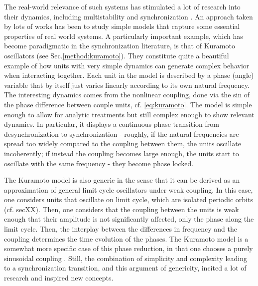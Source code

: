 The real-world relevance of such systems has stimulated a lot of research into their dynamics, including multistability and synchronization \cite{}. An approach taken by lots of works has been to study simple models that capture some essential properties of real world systems. A particularly important example, which has become paradigmatic in the synchronization literature, is that of Kuramoto oscillators (see Sec.\ref{method:kuramoto}). They constitute quite a beautiful example of how units with very simple dynamics can generate complex behavior when interacting together. Each unit in the model is described by a phase (angle) variable that by itself just varies linearly according to its own natural frequency. The interesting dynamics comes from the nonlinear coupling, done via the sin of the phase difference between couple units, cf. \eqref{eq:kuramoto}. The model is simple enough to allow for analytic treatments \cite{} but still complex enough to show relevant dynamics. In particular, it displays a continuous phase transition from desynchronization to synchronization - roughly, if the natural frequencies are spread too widely compared to the coupling between them, the units oscillate incoherently; if instead the coupling becomes large enough, the units start to oscillate with the same frequency - they become phase locked. 

The Kuramoto model is also generic in the sense that it can be derived as an approximation of general limit cycle oscillators under weak coupling. In this case, one considers units that oscillate on limit cycle, which are isolated periodic orbits (cf. secXX). Then, one considers that the coupling between the units is weak enough that their amplitude is not significantly affected, only the phase along the limit cycle. Then, the interplay between the differences in frequency and the coupling determines the time evolution of the phases. The Kuramoto model is a somewhat more specific case of this phase reduction, in that one chooses a purely sinusoidal coupling \cite{}. Still, the combination of simplicity and complexity leading to a synchronization transition, and this argument of genericity, incited a lot of research \cite{} and inspired new concepts.

